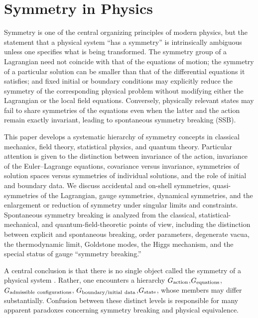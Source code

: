 \chapter {Symmetry in Physics}
\label{symmetry-in-physics}
Symmetry is one of the central organizing principles of modern physics, but the
statement that a physical system ``has a symmetry'' is intrinsically ambiguous
unless one specifies  what  is being transformed.  The symmetry group of a
Lagrangian need not coincide with that of the equations of motion; the symmetry
of a particular solution can be smaller than that of the differential equations
it satisfies; and fixed initial or boundary conditions may explicitly reduce
the symmetry of the corresponding physical problem without modifying either the
Lagrangian or the local field equations.  Conversely, physically relevant
states may fail to share symmetries of the equations even when the latter and
the action remain exactly invariant, leading to spontaneous symmetry breaking
(SSB).

This paper develops a systematic hierarchy of symmetry concepts in classical
mechanics, field theory, statistical physics, and quantum theory.  Particular
attention is given to the distinction between invariance of the action,
invariance of the Euler--Lagrange equations, covariance versus invariance,
symmetries of solution spaces versus symmetries of individual solutions, and
the role of initial and boundary data.  We discuss accidental and on-shell
symmetries, quasi-symmetries of the Lagrangian, gauge symmetries, dynamical
symmetries, and the enlargement or reduction of symmetry under singular limits
and constraints.  Spontaneous symmetry breaking is analyzed from the classical,
statistical-mechanical, and quantum-field-theoretic points of view, including
the distinction between explicit and spontaneous breaking, order parameters,
degenerate vacua, the thermodynamic limit, Goldstone modes, the Higgs
mechanism, and the special status of gauge ``symmetry breaking.''

A central conclusion is that there is no single object called  the symmetry of
a physical system .  Rather, one encounters a hierarchy
$G_{\rm action}$,$G_{\rm equations}$,$G_{\rm admissible\ configurations}$,
$G_{\rm boundary/initial\ data}$,$G_{\rm state}$,
whose members may differ substantially.  Confusion between these distinct
levels is responsible for many apparent paradoxes concerning symmetry breaking
and physical equivalence.

